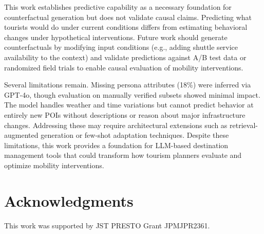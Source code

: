 \documentclass[letterpaper]{article}
\begin{document}
This work establishes predictive capability as a necessary foundation for counterfactual generation but does not validate causal claims. Predicting what tourists would do under current conditions differs from estimating behavioral changes under hypothetical interventions. Future work should generate counterfactuals by modifying input conditions (e.g., adding shuttle service availability to the context) and validate predictions against A/B test data or randomized field trials to enable causal evaluation of mobility interventions.

Several limitations remain. Missing persona attributes (18\%) were inferred via GPT-4o, though evaluation on manually verified subsets showed minimal impact. The model handles weather and time variations but cannot predict behavior at entirely new POIs without descriptions or reason about major infrastructure changes. Addressing these may require architectural extensions such as retrieval-augmented generation or few-shot adaptation techniques. Despite these limitations, this work provides a foundation for LLM-based destination management tools that could transform how tourism planners evaluate and optimize mobility interventions.

\section{Acknowledgments}

This work was supported by JST PRESTO Grant JPMJPR2361.


\end{document}
